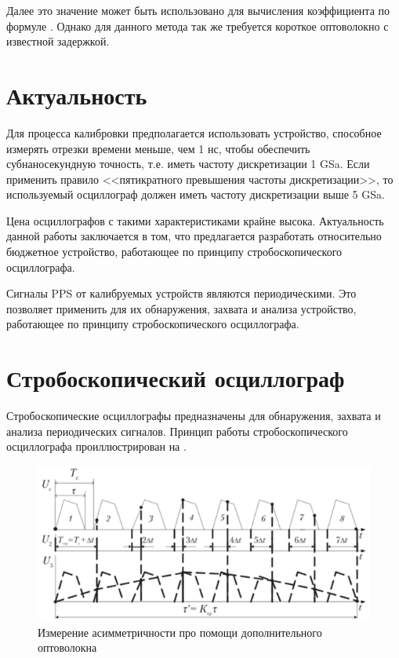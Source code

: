 Далее это значение может быть использовано для вычисления коэффициента по формуле . Однако для данного метода так же требуется
короткое оптоволокно с известной задержкой.

\section{Актуальность}

Для процесса калибровки предполагается использовать устройство, способное измерять отрезки времени меньше, чем 1 нс, чтобы обеспечить
субнаносекундную точность, т.е. иметь частоту дискретизации 1 GSa. Если применить правило <<пятикратного превышения частоты дискретизации>>, то
используемый осциллограф должен иметь частоту дискретизации выше 5 GSa. 

Цена осциллографов с такими характеристиками крайне высока. Актуальность данной работы заключается в том, что предлагается разработать
относительно бюджетное устройство, работающее по принципу стробоскопического осциллографа.
 
Сигналы PPS от калибруемых устройств являются периодическими. Это позволяет применить для их обнаружения, захвата и анализа устройство,
работающее по принципу стробоскопического осциллографа.

\section{Стробоскопический осциллограф}

Стробоскопические осциллографы предназначены для обнаружения, захвата и анализа периодических сигналов.
Принцип работы стробоскопического осциллографа проиллюстрирован на .

\begin{figure}[ht!] 
	\center
	\includegraphics {my_folder/images//stb_osc}
	\caption{Измерение асимметричности про помощи дополнительного оптоволокна} 
	\label{fig:stb-osc}  
\end{figure}

